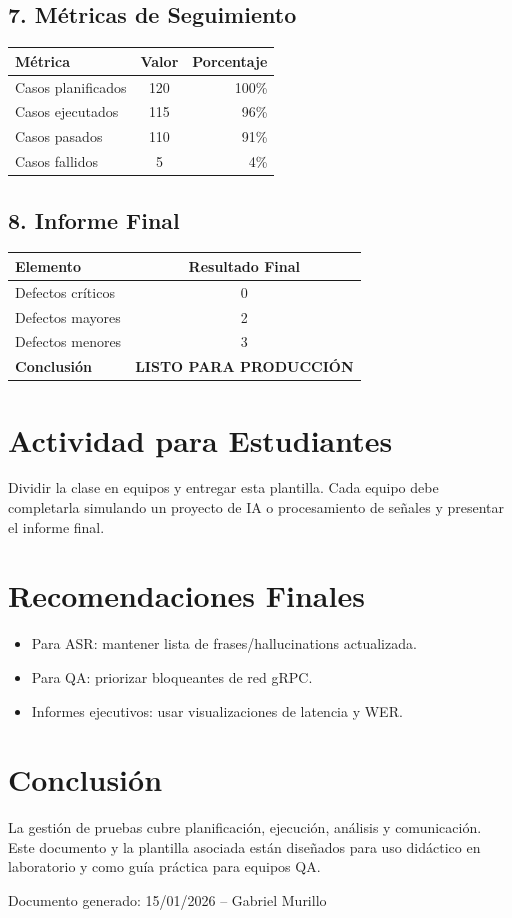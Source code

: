 \documentclass[12pt,a4paper]{article}
\begin{document}
\subsection{7. Métricas de Seguimiento}
\begin{table}[h!]
\centering
\begin{tabular}{|l|c|r|}
\hline
\rowcolor{headergrey} \textbf{Métrica} & \textbf{Valor} & \textbf{Porcentaje} \\ \hline
Casos planificados & 120 & 100\% \\ \hline
Casos ejecutados & 115 & 96\% \\ \hline
Casos pasados & 110 & 91\% \\ \hline
Casos fallidos & 5 & 4\% \\ \hline
\end{tabular}
\end{table}

\subsection{8. Informe Final}
\begin{table}[h!]
\centering
\begin{tabular}{|l|c|}
\hline
\rowcolor{headergrey} \textbf{Elemento} & \textbf{Resultado Final} \\ \hline
Defectos críticos & 0 \\ \hline
Defectos mayores & 2 \\ \hline
Defectos menores & 3 \\ \hline
\rowcolor{statusgreen} \textbf{Conclusión} & \textbf{LISTO PARA PRODUCCIÓN} \\ \hline
\end{tabular}
\end{table}

\section{Actividad para Estudiantes}
Dividir la clase en equipos y entregar esta plantilla. Cada equipo debe completarla simulando un proyecto de IA o procesamiento de señales y presentar el informe final.

\section{Recomendaciones Finales}
\begin{itemize}
  \item Para ASR: mantener lista de frases/hallucinations actualizada.
  \item Para QA: priorizar bloqueantes de red gRPC.
  \item Informes ejecutivos: usar visualizaciones de latencia y WER.
\end{itemize}

\section*{Conclusión}
La gestión de pruebas cubre planificación, ejecución, análisis y comunicación. Este documento y la plantilla asociada están diseñados para uso didáctico en laboratorio y como guía práctica para equipos QA.

\vfill
\noindent Documento generado: 15/01/2026 -- Gabriel Murillo
\end{document}
